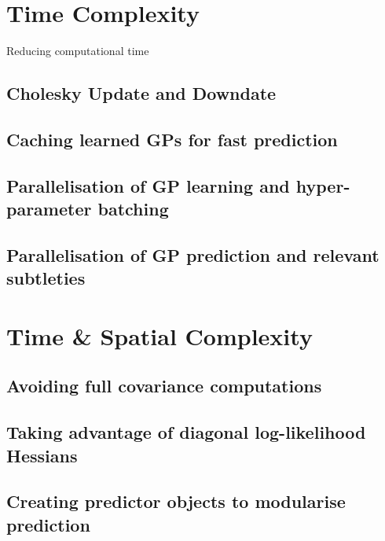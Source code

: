 	\section{Time Complexity}
	\label{Appendix:ComputationalAspects:TimeComplexity}
	
		Reducing computational time
		
		
		\subsection{Cholesky Update and Downdate}
		\label{Appendix:ComputationalAspects:TimeComplexity:CholeskyUpdateDowndate}
		
		\subsection{Caching learned GPs for fast prediction}
		
		\subsection{Parallelisation of GP learning and hyper-parameter batching}
		
		\subsection{Parallelisation of GP prediction and relevant subtleties}
		
		
		
	\section{Time \& Spatial Complexity}
	\label{Appendix:ComputationalAspects:TimeSpaceComplexity}
	
		\subsection{Avoiding full covariance computations}
		\label{Appendix:ComputationalAspects:TimeSpaceComplexity:CovarianceAvoidance}
		
		\subsection{Taking advantage of diagonal log-likelihood Hessians}
		\label{Appendix:ComputationalAspects:TimeSpaceComplexity:DiagonalHessians}
		
		\subsection{Creating predictor objects to modularise prediction}
		
		